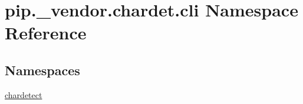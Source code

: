\hypertarget{namespacepip_1_1__vendor_1_1chardet_1_1cli}{}\section{pip.\+\_\+vendor.\+chardet.\+cli Namespace Reference}
\label{namespacepip_1_1__vendor_1_1chardet_1_1cli}
\subsection*{Namespaces}
\begin{DoxyCompactItemize}
\item 
 \hyperlink{namespacepip_1_1__vendor_1_1chardet_1_1cli_1_1chardetect}{chardetect}
\end{DoxyCompactItemize}
